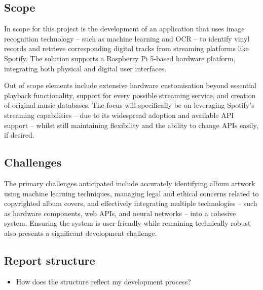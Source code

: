         \subsection{Scope}
    
            In scope for this project is the development of an application that uses image recognition technology -- such as machine learning and OCR -- to identify vinyl records and retrieve corresponding digital tracks from streaming platforms like Spotify. The solution supports a Raspberry Pi 5-based hardware platform, integrating both physical and digital user interfaces.
    
            Out of scope elements include extensive hardware customisation beyond essential playback functionality, support for every possible streaming service, and creation of original music databases. The focus will specifically be on leveraging Spotify's streaming capabilities -- due to its widespread adoption and available API support -- whilst still maintaining flexibility and the ability to change APIs easily, if desired.
        
        \subsection{Challenges}
    
            The primary challenges anticipated include accurately identifying album artwork using machine learning techniques, managing legal and ethical concerns related to copyrighted album covers, and effectively integrating multiple technologies -- such as hardware components, web APIs, and neural networks -- into a cohesive system. Ensuring the system is user-friendly while remaining technically robust also presents a significant development challenge.
        
        \subsection{Report structure} %
    
            \begin{temp}
                \begin{itemize}
                    \item How does the structure reflect my development process?
                \end{itemize}
            \end{temp}
        
